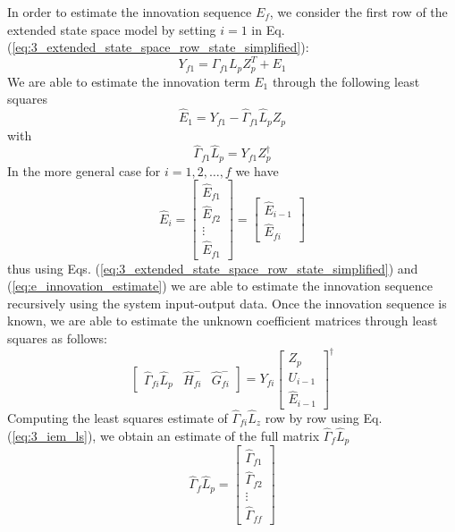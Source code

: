 In order to estimate the innovation sequence $E_f$, we consider the first row of the extended state space model by setting $i = 1$ in Eq. (\ref{eq:3_extended_state_space_row_state_simplified}):
\begin{equation}
Y_{f1} = \Gamma_{f1}L_p Z_p^T + E_{1}
\end{equation}
We are able to estimate the innovation term $E_1$ through the following least squares
\begin{equation}
\hat{E}_1 = Y_{f1} - \hat{\Gamma}_{f1}\hat{L}_p Z_p
\end{equation}
with
\begin{equation}
\hat{\Gamma}_{f1}\hat{L}_p = Y_{f1} Z_p^\dagger
\end{equation}
In the more general case for $i = 1,2,\dots,f$ we have
\begin{equation}\label{eq:e_innovation_estimate}
\hat{E}_i = \begin{bmatrix}\hat{E}_{f1}\\ \hat{E}_{f2}\\ \vdots \\\hat{E}_{f1}\end{bmatrix} = 
\begin{bmatrix} \hat{E}_{i-1}\\\hat{E}_{fi}\end{bmatrix}
\end{equation}
thus using Eqs. (\ref{eq:3_extended_state_space_row_state_simplified}) and (\ref{eq:e_innovation_estimate}) we are able to estimate the innovation sequence recursively using the system input-output data. Once the innovation sequence is known, we are able to estimate the unknown coefficient matrices  through least squares as follows:
\begin{equation}\label{eq:3_iem_ls}
\begin{bmatrix}\hat{\Gamma}_{fi}\hat{L}_p & \hat{H}_{fi}^- & \hat{G}_{fi}^-\end{bmatrix} = Y_{fi}
\begin{bmatrix}Z_p\\ U_{i-1}\\ \hat{E}_{i-1}\end{bmatrix}^\dagger
\end{equation}
Computing the least squares estimate of $\hat{\Gamma}_{fi}\hat{L}_z$ row by row using Eq. (\ref{eq:3_iem_ls}), we obtain an estimate of the full matrix $\hat{\Gamma}_f\hat{L}_p$
\begin{equation*}
\hat{\Gamma}_f \hat{L}_p = \begin{bmatrix}
\hat{\Gamma}_{f1}\\ \hat{\Gamma}_{f2}\\ \vdots \\ \hat{\Gamma}_{ff}
\end{bmatrix}
\end{equation*}

